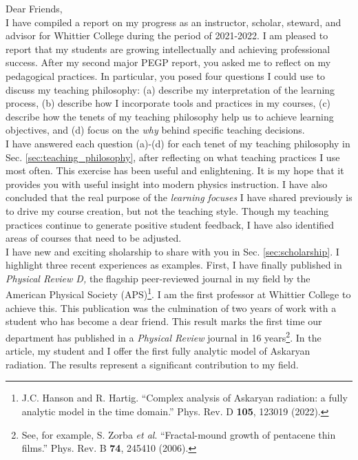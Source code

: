 \documentclass[../../main.tex]{subfiles}
\begin{document}
Dear Friends,
\\
\vspace{0.25cm}
I have compiled a report on my progress as an instructor, scholar, steward, and advisor for Whittier College during the period of 2021-2022.  I am pleased to report that my students are growing intellectually and achieving professional success.  After my second major PEGP report, you asked me to reflect on my pedagogical practices.  In particular, you posed four questions I could use to discuss my teaching philosophy: (a) describe my interpretation of the learning process, (b) describe how I incorporate tools and practices in my courses, (c) describe how the tenets of my teaching philosophy help us to achieve learning objectives, and (d) focus on the \textit{why} behind specific teaching decisions.
\\
\vspace{0.25cm}
I have answered each question (a)-(d) for each tenet of my teaching philosophy in Sec. \ref{sec:teaching_philosophy}, after reflecting on what teaching practices I use most often.  This exercise has been useful and enlightening.  It is my hope that it provides you with useful insight into modern physics instruction.  I have also concluded that the real purpose of the \textit{learning focuses} I have shared previously is to drive my course creation, but not the teaching style.  Though my teaching practices continue to generate positive student feedback, I have also identified areas of courses that need to be adjusted.
\\
\vspace{0.25cm}
I have new and exciting sholarship to share with you in Sec. \ref{sec:scholarship}.  I highlight three recent experiences as examples.  First, I have finally published in \textit{Physical Review D,} the flagship peer-reviewed journal in my field by the American Physical Society (APS)\footnote{J.C. Hanson and R. Hartig. ``Complex analysis of Askaryan radiation: a fully analytic model in the time domain.'' Phys. Rev. D \textbf{105}, 123019 (2022).}.  I am the first professor at Whittier College to achieve this.  This publication was the culmination of two years of work with a student who has become a dear friend.  This result marks the first time our department has published in a \textit{Physical Review} journal in 16 years\footnote{See, for example, S. Zorba \textit{et al}. ``Fractal-mound growth of pentacene thin films.'' Phys. Rev. B \textbf{74}, 245410 (2006).}.  In the article, my student and I offer the first fully analytic model of Askaryan radiation.  The results represent a significant contribution to my field.
\end{document}
